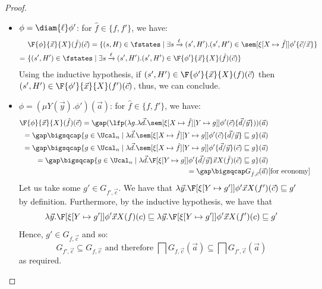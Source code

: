 \begin{proof}
\begin{itemize}
		\item $\phi = \diam{\ell} \phi'$: for $\hat f \in \{f,f'\}$, we have:
		\begin{align*}
		&\F{\phi}{\vec x}{X}(\hat f)(\vec c) = \{(s, H) \in \fstates \mid \exists s\xrightarrow{\ell}(s', H').(s', H')\in \sem[{\xi[X\mapsto \hat f]}]{\phi'\{\vec c / \vec x\}} \} 
		\\=\ & \{(s', H') \in \fstates \mid \exists s\xrightarrow{\ell}(s', H').(s', H') \in \F{\phi'}{\vec x}{X}(\hat f)(\vec c)\}
		\end{align*}
		Using the inductive hypothesis, if $(s', H')\in \F{\phi'}{\vec x}{X}(f)(\vec c)$ then $(s', H')\in \F{\phi'}{\vec x}{X}(f')(\vec c)$,
		thus, we can conclude.
		\item $\phi = (\mu Y(\vec y).\phi')(\vec a)$: for $\hat f \in \{f,f'\}$, we have:
    	\begin{align*}
			\F{\phi}{\vec x}{X}(\hat f)(\vec c) =\gap (\lfp(\lambda g. \lambda \vec d.\sem[{\xi[X\mapsto \hat f][Y\mapsto g]}]{\phi'(\vec c)\{\vec d/\vec y\}}))(\vec a) \\
						=\gap \bigsqcap \{g\in \Ucal_n\mid 
			\lambda \vec d. \sem[{\xi[X\mapsto \hat f][Y\mapsto g]}]{\phi'(\vec c)\{\vec d/\vec y\}}\sqsubseteq g\}(\vec a)\\
			=\gap\bigsqcap \{g\in \Ucal_n\mid 
			\lambda \vec d. \sem[{\xi[X\mapsto \hat f][Y\mapsto g]}]{\phi'\{\vec d/\vec y\}(\vec c)}\sqsubseteq g\}(\vec a)\\
			=\gap \bigsqcap\{g \in \Ucal_n\mid \lambda \vec d.\F[{\xi[Y\mapsto g]}]{\phi'\{\vec d/\vec y\}}{\vec x}{X}(\hat f)(\vec c) \sqsubseteq g\}(\vec a)\\
			=\gap \bigsqcap G_{\hat f, \vec c}(\vec a) &[\text{for economy}]
		\end{align*}
		Let us take some $ g' \in G_{f', \vec c}$.
		We have that $\lambda \vec y.\F[{\xi[Y\mapsto g']}]{\phi'}{\vec x}{X}(f')(\vec c) \sqsubseteq g'$ by definition.
		Furthermore, by the inductive hypothesis,
		we have that 
		$$\lambda \vec y.\F[{\xi[Y\mapsto g']}]{\phi'}{\vec x}{X}(f)(c)\sqsubseteq\lambda \vec y.\F[{\xi[Y\mapsto g']}]{\phi'}{\vec x}{X}(f')(c) \sqsubseteq g'$$
		Hence, $g' \in G_{f, \vec c}$ and so: 
		\[
			G_{f', \vec c} \subseteq G_{f, \vec c} \text{ and therefore } \bigsqcap G_{f, \vec c} (\vec a) \subseteq \bigsqcap G_{f', \vec c} (\vec a)
		\]
		as required.
	\end{itemize}

		
\end{proof}
	
